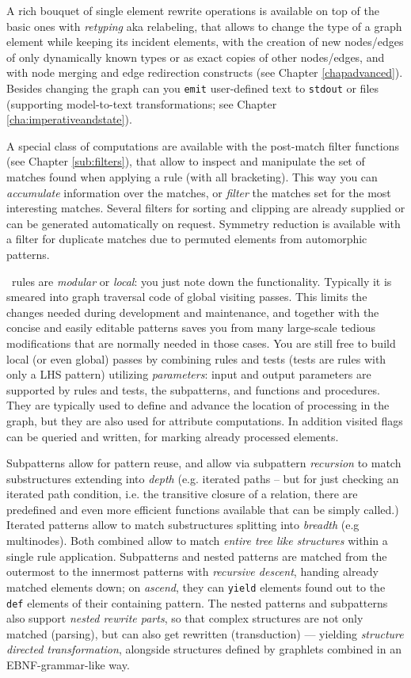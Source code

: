 A rich bouquet of single element rewrite operations is available on top of the basic ones with \emph{retyping} aka relabeling, that allows to change the type of a graph element while keeping its incident elements, with the creation of new nodes/edges of only dynamically known types or as exact copies of other nodes/edges, and with node merging and edge redirection constructs (see Chapter \ref{chapadvanced}).
Besides changing the graph can you \texttt{emit} user-defined text to \texttt{stdout} or files (supporting model-to-text transformations; see Chapter \ref{cha:imperativeandstate}).

A special class of computations are available with the post-match filter functions (see Chapter \ref{sub:filters}), that allow to inspect and manipulate the set of matches found when applying a rule (with all bracketing). 
This way you can \emph{accumulate} information over the matches, or \emph{filter} the matches set for the most interesting matches.
Several filters for sorting and clipping are already supplied or can be generated automatically on request.
Symmetry reduction is available with a filter for duplicate matches due to permuted elements from automorphic patterns.

\GrG\ rules are \emph{modular} or \emph{local}: you just note down the functionality.
Typically it is smeared into graph traversal code of global visiting passes.
This limits the changes needed during development and maintenance, and together with the concise and easily editable patterns saves you from many large-scale tedious modifications that are normally needed in those cases.
You are still free to build local (or even global) passes by combining rules and tests (tests are rules with only a LHS pattern) utilizing \emph{parameters}: input and output parameters are supported by rules and tests, the subpatterns, and functions and procedures.
They are typically used to define and advance the location of processing in the graph, but they are also used for attribute computations.
In addition visited flags can be queried and written, for marking already processed elements.

Subpatterns allow for pattern reuse, and allow via subpattern \emph{recursion} to match substructures extending into \emph{depth} (e.g. iterated paths -- but for just checking an iterated path condition, i.e. the transitive closure of a relation, there are predefined and even more efficient functions available that can be simply called.)
Iterated patterns allow to match substructures splitting into \emph{breadth} (e.g multinodes).
Both combined allow to match \emph{entire tree like structures} within a single rule application. 
Subpatterns and nested patterns are matched from the outermost to the innermost patterns with \emph{recursive descent}, handing already matched elements down; on \emph{ascend}, they can \texttt{yield} elements found out to the \texttt{def} elements of their containing pattern.
The nested patterns and subpatterns also support \emph{nested rewrite parts}, so that complex structures are not only matched (parsing), but can also get rewritten (transduction) --- yielding \emph{structure directed transformation}, alongside structures defined by graphlets combined in an EBNF-grammar-like way\cite{EBNFAGTIVE}.

